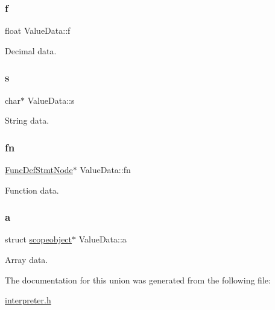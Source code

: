 \subsubsection{\texorpdfstring{f}{f}}
{\footnotesize\ttfamily float Value\+Data\+::f}

Decimal data. \mbox{\label{union_value_data_a2639b48549e0788d5f9a3da6ea9cb0e4}} 
\subsubsection{\texorpdfstring{s}{s}}
{\footnotesize\ttfamily char$\ast$ Value\+Data\+::s}

String data. \mbox{\label{union_value_data_a594cfb13fb480c8bd1d1c4ae61b90b1b}} 
\subsubsection{\texorpdfstring{fn}{fn}}
{\footnotesize\ttfamily \hyperlink{struct_func_def_stmt_node}{Func\+Def\+Stmt\+Node}$\ast$ Value\+Data\+::fn}

Function data. \mbox{\label{union_value_data_ada5802e9c9ae4f8f0ce47b5cdfcc0def}} 
\subsubsection{\texorpdfstring{a}{a}}
{\footnotesize\ttfamily struct \hyperlink{structscopeobject}{scopeobject}$\ast$ Value\+Data\+::a}

Array data. 

The documentation for this union was generated from the following file\+:\begin{DoxyCompactItemize}
\item 
\hyperlink{interpreter_8h}{interpreter.\+h}\end{DoxyCompactItemize}
